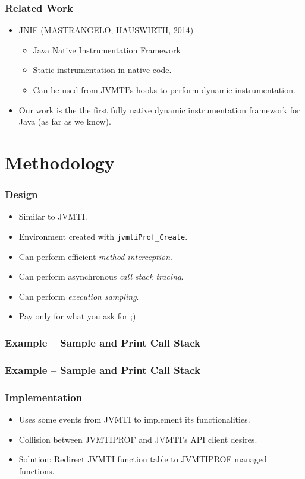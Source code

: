 \documentclass{beamer}
\begin{document}
\begin{frame}
\frametitle{Related Work}
\begin{itemize}
\item JNIF (MASTRANGELO; HAUSWIRTH, 2014)
\begin{itemize}
\item Java Native Instrumentation Framework
\item Static instrumentation in native code.
\item Can be used from JVMTI's hooks to perform dynamic instrumentation.
\end{itemize}
\item Our work is the the first fully native dynamic instrumentation framework for Java (as far as we know).
\end{itemize}
\end{frame}


\section{Methodology}

\begin{frame}
\frametitle{Design}
\begin{itemize}
\item Similar to JVMTI.
\item Environment created with \lstinline{jvmtiProf_Create}.
\item Can perform efficient \emph{method interception}.
\item Can perform asynchronous \emph{call stack tracing}.
\item Can perform \emph{execution sampling}.
\item Pay only for what you ask for ;)
\end{itemize}
\end{frame}

\begin{frame}
\frametitle{Example -- Sample and Print Call Stack}

\end{frame}

\begin{frame}
\frametitle{Example -- Sample and Print Call Stack}

\end{frame}

\begin{frame}
\frametitle{Implementation}
\begin{itemize}
\item Uses some events from JVMTI to implement its functionalities.
\item Collision between JVMTIPROF and JVMTI's API client desires.
\item Solution: Redirect JVMTI function table to JVMTIPROF managed functions.
\end{itemize}
\end{frame}
\end{document}
